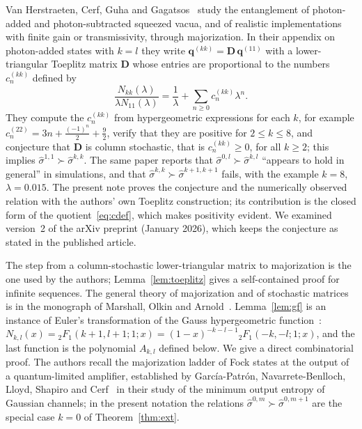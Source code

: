 \documentclass[11pt,a4paper]{article}
\theoremstyle{definition}
\theoremstyle{plain}
\newcommand{\sig}[2]{\hat\sigma^{#1,#2}}
\begin{document}
Van Herstraeten, Cerf, Guha and Gagatsos~\cite{VanHerstraeten2024} study the
entanglement of photon-added and photon-subtracted squeezed vacua, and of
realistic implementations with finite gain or transmissivity, through
majorization. In their appendix on photon-added states with $k=l$ they write
$\mathbf q^{(kk)}=\mathbf D\,\mathbf q^{(11)}$ with a lower-triangular Toeplitz
matrix $\mathbf D$ whose entries are proportional to the numbers
$c^{(kk)}_n$ defined by
\begin{equation}\label{eq:cdef}
\frac{N_{kk}(\lambda)}{\lambda N_{11}(\lambda)}=\frac1\lambda+\sum_{n\ge0}c^{(kk)}_n\lambda^n .
\end{equation}
They compute the $c^{(kk)}_n$ from hypergeometric expressions for each $k$, for
example $c^{(22)}_n=3n+\tfrac{(-1)^n}{2}+\tfrac92$, verify that they are
positive for $2\le k\le 8$, and conjecture that $\mathbf D$ is column
stochastic, that is $c^{(kk)}_n\ge0$, for all $k\ge2$; this implies
$\sig11\succ\sig kk$. The same paper reports that $\sig0l\succ\sig kl$
``appears to hold in general'' in simulations, and that
$\sig kk\succ\sig{k+1}{k+1}$ fails, with the example $k=8$, $\lambda=0.015$.
The present note proves the conjecture and the numerically observed relation
with the authors' own Toeplitz construction; its contribution is the closed
form of the quotient~\eqref{eq:cdef}, which makes positivity evident. We
examined version~2 of the arXiv preprint (January 2026), which keeps the
conjecture as stated in the published article.

The step from a column-stochastic lower-triangular matrix to majorization is
the one used by the authors; Lemma~\ref{lem:toeplitz} gives a self-contained
proof for infinite sequences. The general theory of majorization and of
stochastic matrices is in the monograph of Marshall, Olkin and
Arnold~\cite{MarshallOlkin2011}. Lemma~\ref{lem:gf} is an instance of Euler's
transformation of the Gauss hypergeometric function~\cite[Eq.~15.8.1]{DLMF}:
$N_{k,l}(x)={}_2F_1(k+1,l+1;1;x)=(1-x)^{-k-l-1}{}_2F_1(-k,-l;1;x)$, and the
last function is the polynomial $A_{k,l}$ defined below. We give a direct
combinatorial proof. The authors recall the majorization ladder of Fock states
at the output of a quantum-limited amplifier, established by
Garc\'ia-Patr\'on, Navarrete-Benlloch, Lloyd, Shapiro and
Cerf~\cite{GarciaPatron2012} in their study of the minimum output entropy of
Gaussian channels; in the present notation the relations $\sig0m\succ\sig0{m+1}$
are the special case $k=0$ of Theorem~\ref{thm:ext}.
\end{document}
